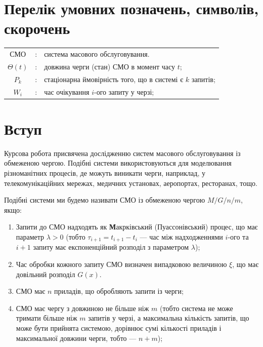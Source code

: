 \documentclass[14pt]{extarticle}
\begin{document}
\newpage

\setcounter{tocdepth}{2}
\tableofcontents
\newpage

\section{Перелік умовних позначень, символів, скорочень}
\begin{table}[h!]
  \centering
  \begin{tabular}{ c c l }
    СМО &:& система масового обслуговування. \\
    \(\Theta(t)\) &:& довжина черги (стан) СМО в момент часу \(t\); \\
    \(P_{k}\) &:& стаціонарна ймовірність того, що в системі є \(k\) запитів; \\
    \(W_{i}\) &:& час очікування \(i\)-ого запиту у черзі; \\
  \end{tabular}
\end{table}

\newpage

\section{Вступ}\label{sec:intro}

Курсова робота присвячена дослідженню систем масового обслуговування із
обмеженою чергою. Подібні системи використовуються для моделювання різноманітних
процесів, де можуть виникати черги, наприклад, у телекомунікаційних мережах,
медичних установах, аеропортах, ресторанах, тощо.

Подібні системи ми будемо називати СМО із обмеженою чергою \(M/G/n/m\), якщо:

\begin{enumerate}
  \item Запити до СМО надходять як \textbf{М}акрківський (Пуассонівський)
        процес, що має параметр \(\lambda > 0\) (тобто \(\tau_{i+1} = t_{i+1} - t_{i}\) ---
        час між надходженнями \(i\)-ого та \(i+1\) запиту має експоненційний
        розподіл з параметром \(\lambda\));
  \item Час обробки кожного запиту СМО визначен випадковою величиною \(\xi\), що
        має довільний розподіл \(G(x)\).
  \item СМО має \(n\) приладів, що обробляють запити із черги;
  \item СМО має чергу з довжиною не більше ніж \(m\) (тобто система не може
        тримати більше ніж \(m\) запитів у черзі, а максимальна кількість
        запитів, що може бути прийнята системою, дорівнює сумі кількості
        приладів і максимальної довжини черги, тобто --- \(n + m\));
\end{enumerate}
\end{document}
